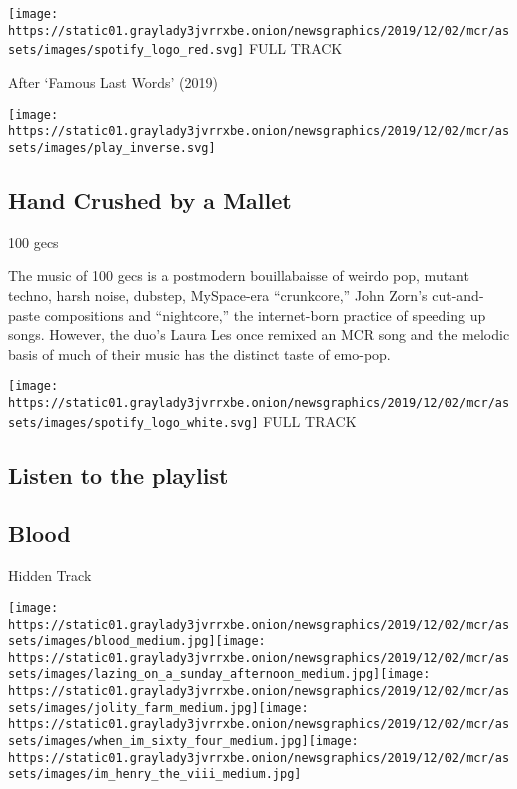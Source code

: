 \texttt{[image: https://static01.graylady3jvrrxbe.onion/newsgraphics/2019/12/02/mcr/assets/images/spotify\_logo\_red.svg]}
FULL TRACK

After `Famous Last Words' (2019)

\texttt{[image: https://static01.graylady3jvrrxbe.onion/newsgraphics/2019/12/02/mcr/assets/images/play\_inverse.svg]}

\hypertarget{hand-crushed-by-a-mallet}{%
\subsection{Hand Crushed by a Mallet}\label{hand-crushed-by-a-mallet}}

100 gecs

The music of 100 gecs is a postmodern bouillabaisse of weirdo pop,
mutant techno, harsh noise, dubstep, MySpace-era ``crunkcore,'' John
Zorn's cut-and-paste compositions and ``nightcore,'' the internet-born
practice of speeding up songs. However, the duo's Laura Les once remixed
an MCR song and the melodic basis of much of their music has the
distinct taste of emo-pop.

\href{https://open.spotify.com/track/0XWTLNFUHKMfUuTlWqHkeO?si=uSaOEt4wSj2CrKJU8bkZMA}{}

\texttt{[image: https://static01.graylady3jvrrxbe.onion/newsgraphics/2019/12/02/mcr/assets/images/spotify\_logo\_white.svg]}
FULL TRACK

\hypertarget{listen-to-the-playlist}{%
\subsection{Listen to the playlist}\label{listen-to-the-playlist}}

\hypertarget{blood}{%
\subsection{Blood}\label{blood}}

Hidden Track

\texttt{[image: https://static01.graylady3jvrrxbe.onion/newsgraphics/2019/12/02/mcr/assets/images/blood\_medium.jpg]}\texttt{[image: https://static01.graylady3jvrrxbe.onion/newsgraphics/2019/12/02/mcr/assets/images/lazing\_on\_a\_sunday\_afternoon\_medium.jpg]}\texttt{[image: https://static01.graylady3jvrrxbe.onion/newsgraphics/2019/12/02/mcr/assets/images/jolity\_farm\_medium.jpg]}\texttt{[image: https://static01.graylady3jvrrxbe.onion/newsgraphics/2019/12/02/mcr/assets/images/when\_im\_sixty\_four\_medium.jpg]}\texttt{[image: https://static01.graylady3jvrrxbe.onion/newsgraphics/2019/12/02/mcr/assets/images/im\_henry\_the\_viii\_medium.jpg]}

